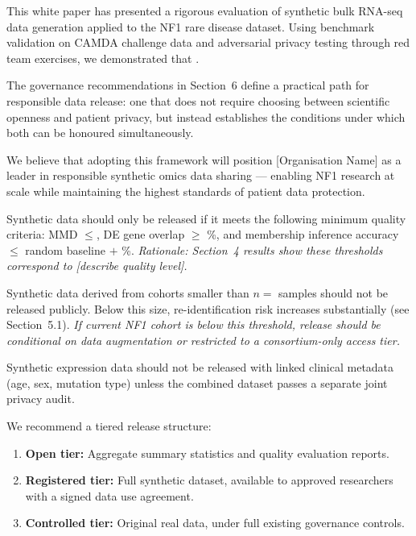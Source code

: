 This white paper has presented a rigorous evaluation of synthetic bulk
RNA-seq data generation applied to the NF1 rare disease dataset.
Using benchmark validation on CAMDA challenge data and adversarial
privacy testing through red team exercises, we demonstrated that
.

The governance recommendations in Section~6 define a practical path
for responsible data release: one that does not require choosing between
scientific openness and patient privacy, but instead establishes the
conditions under which both can be honoured simultaneously.

We believe that adopting this framework will position [Organisation Name]
as a leader in responsible synthetic omics data sharing — enabling
NF1 research at scale while maintaining the highest standards of
patient data protection.



\begin{recbox}[title={Recommendation 1 — Minimum quality threshold before release}]
  Synthetic data should only be released if it meets the following
  minimum quality criteria: MMD $\leq$,
  DE gene overlap $\geq$ \%, and membership inference accuracy
  $\leq$ random baseline $+$ \%.
  \textit{Rationale: Section~4 results show these thresholds correspond
  to [describe quality level].}
\end{recbox}

\begin{recbox}[title={Recommendation 2 — Cohort size floor}]
  Synthetic data derived from cohorts smaller than $n = $ 
  samples should not be released publicly.
  Below this size, re-identification risk increases substantially
  (see Section~5.1).
  \textit{If current NF1 cohort is below this threshold, release should be
  conditional on data augmentation or restricted to a consortium-only access tier.}
\end{recbox}

\begin{recbox}[title={Recommendation 3 — Metadata separation}]
  Synthetic expression data should not be released with linked clinical
  metadata (age, sex, mutation type) unless the combined dataset passes
  a separate joint privacy audit.
\end{recbox}

\begin{recbox}[title={Recommendation 4 — Tiered access model}]
  We recommend a tiered release structure:
  \begin{enumerate}
    \item \textbf{Open tier:} Aggregate summary statistics and
          quality evaluation reports.
    \item \textbf{Registered tier:} Full synthetic dataset, available
          to approved researchers with a signed data use agreement.
    \item \textbf{Controlled tier:} Original real data, under full
          existing governance controls.
  \end{enumerate}
\end{recbox}

